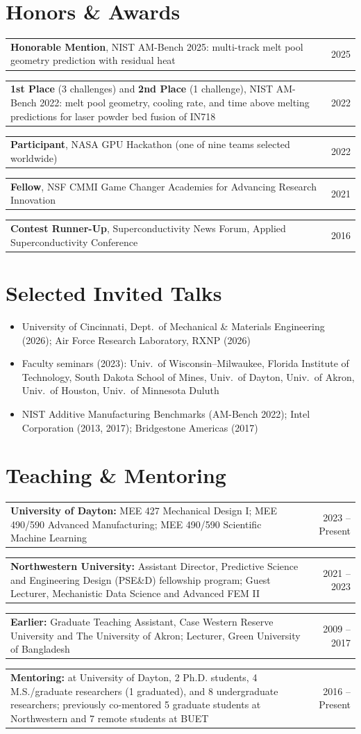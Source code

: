 \documentclass[10pt, letterpaper]{article}
\makeatletter
\newcommand{\cvitem}[2]{%
    \par\noindent
    \begin{tabularx}{\linewidth}[t]{@{}X@{\hspace{8 pt}}r@{}}
        #1 & \small\color{darkgray}#2
    \end{tabularx}\par
}
\makeatother
\begin{document}
\section{Honors \& Awards}
    \cvitem{\textbf{Honorable Mention}, NIST AM-Bench 2025: multi-track melt pool geometry prediction with residual heat}{2025}
    \cvitem{\textbf{1st Place} (3 challenges) and \textbf{2nd Place} (1 challenge), NIST AM-Bench 2022: melt pool geometry, cooling rate, and time above melting predictions for laser powder bed fusion of IN718}{2022}
    \cvitem{\textbf{Participant}, NASA GPU Hackathon (one of nine teams selected worldwide)}{2022}
    \cvitem{\textbf{Fellow}, NSF CMMI Game Changer Academies for Advancing Research Innovation}{2021}
    \cvitem{\textbf{Contest Runner-Up}, Superconductivity News Forum, Applied Superconductivity Conference}{2016}

\section{Selected Invited Talks}
    \begin{itemize}
        \item University of Cincinnati, Dept.\ of Mechanical \& Materials Engineering (2026); Air Force Research Laboratory, RXNP (2026)
        \item Faculty seminars (2023): Univ.\ of Wisconsin--Milwaukee, Florida Institute of Technology, South Dakota School of Mines, Univ.\ of Dayton, Univ.\ of Akron, Univ.\ of Houston, Univ.\ of Minnesota Duluth
        \item NIST Additive Manufacturing Benchmarks (AM-Bench 2022); Intel Corporation (2013, 2017); Bridgestone Americas (2017)
    \end{itemize}

\section{Teaching \& Mentoring}
    \cvitem{\textbf{University of Dayton:} MEE 427 Mechanical Design I; MEE 490/590 Advanced Manufacturing; MEE 490/590 Scientific Machine Learning}{2023 -- Present}
    \cvitem{\textbf{Northwestern University:} Assistant Director, Predictive Science and Engineering Design (PSE\&D) fellowship program; Guest Lecturer, Mechanistic Data Science and Advanced FEM II}{2021 -- 2023}
    \cvitem{\textbf{Earlier:} Graduate Teaching Assistant, Case Western Reserve University and The University of Akron; Lecturer, Green University of Bangladesh}{2009 -- 2017}
    \cvitem{\textbf{Mentoring:} at University of Dayton, 2 Ph.D. students, 4 M.S./graduate researchers (1 graduated), and 8 undergraduate researchers; previously co-mentored 5 graduate students at Northwestern and 7 remote students at BUET}{2016 -- Present}
\end{document}
